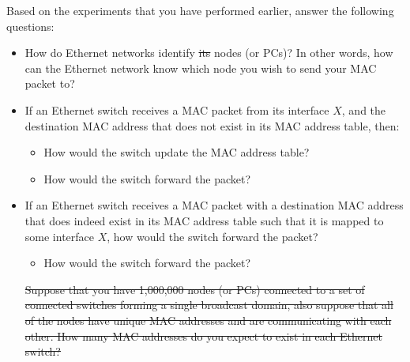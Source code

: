 \documentclass[pdftex,12pt,a4paper]{article}
\providecommand{\DIFadd}[1]{{\protect\color{blue}\uwave{#1}}} %
\providecommand{\DIFdel}[1]{{\protect\color{red}\sout{#1}}}                      %
\providecommand{\DIFaddbegin}{} %
\providecommand{\DIFaddend}{} %
\providecommand{\DIFdelbegin}{} %
\providecommand{\DIFdelend}{} %
\begin{document}
            Based on the experiments that you have performed earlier, answer
            the following questions:
            \begin{itemize}
                \item How do Ethernet networks identify \DIFdelbegin \DIFdel{its }\DIFdelend \DIFaddbegin \DIFadd{their }\DIFaddend nodes (or PCs)? In
                other words, how can the Ethernet network know which node you
                wish to send your MAC packet to?
                \item If an Ethernet switch receives a MAC packet from its
                interface $X$, and the destination MAC address that does not
                exist in its MAC address table, then:
                    \begin{itemize}
                        \item How would the switch update the MAC address
                        table?
                        \item How would the switch forward the packet?
                    \end{itemize}
                \item If an Ethernet switch receives a MAC packet with a
                destination MAC address that does indeed exist in its MAC address
                table such that it is mapped to some interface $X$, how would
                the switch forward the packet?
                    \begin{itemize}
                        \item How would the switch forward the packet?
                    \end{itemize}
            \DIFdelbegin %
\DIFdel{Suppose that you have 1,000,000 nodes (or PCs) connected
                to a set of connected switches forming a single broadcast
                domain, also suppose that all of the nodes have unique MAC
                addresses and are communicating with each other. How many MAC
                addresses do you expect to exist in each Ethernet switch?
            }\DIFdelend \end{itemize}
\end{document}
